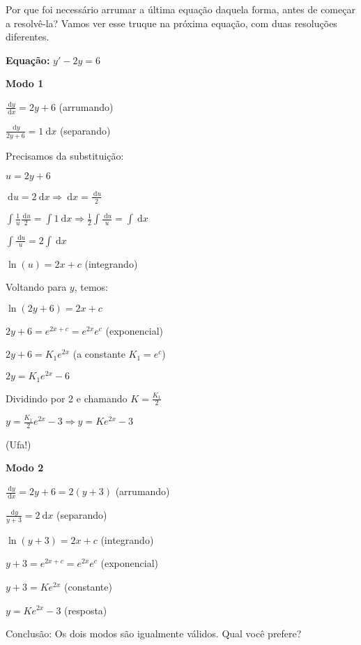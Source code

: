 \documentclass[a4paper]{article}
\newcommand{\ud}{\mathrm{\ d}}
\begin{document}
Por que foi necessário arrumar a última equação daquela forma, antes
de começar a resolvê-la? Vamos ver esse truque na próxima equação, com
duas resoluções diferentes.

{\bf Equação:}
$y' - 2y = 6$

\begin{multicols}{2}
{\bf Modo 1}

\smallskip

$\frac{\ud y}{\ud x} = 2y + 6$ (arrumando)

\smallskip

$\frac{\ud y}{2y+6} = 1\ud x$ (separando)

\smallskip
Precisamos da substituição:

$u = 2y+6$

\smallskip

$\ud u=2\ud x \Rightarrow \ud x = \frac{\ud u}{2}$

\smallskip

$\int \frac{1}{u} \frac{\ud u}{2} = \int 1 \ud x \Rightarrow \frac{1}{2}\int
\frac{\ud u}{u} = \int \ud x$

\smallskip

$\int \frac{\ud u}{u} = 2\int \ud x$

\smallskip

$\ln (u) = 2x+c$ (integrando)

\smallskip

Voltando para $y$, temos:

\smallskip

$\ln(2y+6)= 2x+c$

\smallskip

$2y+6 = e^{2x+c}=e^{2x}e^c$ (exponencial)

\smallskip

$2y+6=K_1e^{2x}$ (a constante $K_1 = e^c$)

\smallskip

$2y=K_1e^{2x} -6$

\smallskip

Dividindo por 2 e chamando $K = \frac{K_1}{2}$

\smallskip

$y=\frac{K_1}{2}e^{2x} -3 \Rightarrow y=Ke^{2x}-3$

\smallskip

(Ufa!)

\columnbreak
{\bf Modo 2}

\smallskip

$\frac{\ud y}{\ud x} = 2y + 6 = 2(y+3)$ (arrumando)

\smallskip

$\frac{\ud y}{y+3} = 2\ud x$ (separando)

\smallskip

$\ln (y+3) = 2x+c$ (integrando)

\smallskip

$y+3 = e^{2x+c} = e^{2x}e^c$ (exponencial)

\smallskip

$y +3 = Ke^{2x}$ (constante)
\smallskip

$y = Ke^{2x} - 3$ (resposta)
\end{multicols}


\bigskip
Conclusão: Os dois modos são igualmente válidos. Qual você prefere?
\end{document}
